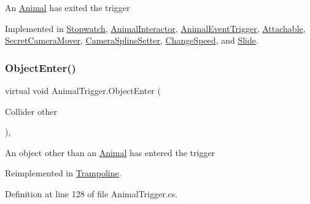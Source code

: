 An \mbox{\hyperlink{class_animal}{Animal}} has exited the trigger 



Implemented in \mbox{\hyperlink{class_stopwatch_ad71c492f52e3396c648501c315bae5e5}{Stopwatch}}, \mbox{\hyperlink{class_animal_interactor_a0ff1e2c10b462d19357913cbf1f2d023}{Animal\+Interactor}}, \mbox{\hyperlink{class_animal_event_trigger_a5fb92b33d31fee51fbf2237fd3aead55}{Animal\+Event\+Trigger}}, \mbox{\hyperlink{class_attachable_adef6aa1287071d15d2724de7c0badbd8}{Attachable}}, \mbox{\hyperlink{class_secret_camera_mover_a7034d7373226a7c514d054ab73df027a}{Secret\+Camera\+Mover}}, \mbox{\hyperlink{class_camera_spline_setter_a4b75777822bf9b381e8a95c11d979e31}{Camera\+Spline\+Setter}}, \mbox{\hyperlink{class_change_speed_ac708140d2ba20cf5bb4307a23f5987dd}{Change\+Speed}}, and \mbox{\hyperlink{class_slide_a69c08279e8270df11ec45fba09dd12ba}{Slide}}.

\mbox{\label{class_animal_trigger_ac9d6fbc38448a5369e5658ae0774bd58}} 
\subsubsection{\texorpdfstring{Object\+Enter()}{ObjectEnter()}}
{\footnotesize\ttfamily virtual void Animal\+Trigger.\+Object\+Enter (\begin{DoxyParamCaption}\item[{Collider}]{other }\end{DoxyParamCaption})\hspace{0.3cm}{\ttfamily [protected]}, {\ttfamily [virtual]}}



An object other than an \mbox{\hyperlink{class_animal}{Animal}} has entered the trigger 



Reimplemented in \mbox{\hyperlink{class_trampoline_a82a3dc5c89e349b31def18b36ee1ad5a}{Trampoline}}.



Definition at line 128 of file Animal\+Trigger.\+cs.

\mbox{\label{class_animal_trigger_aad4a0cd7f224897b7d810429e05b038a}} 
